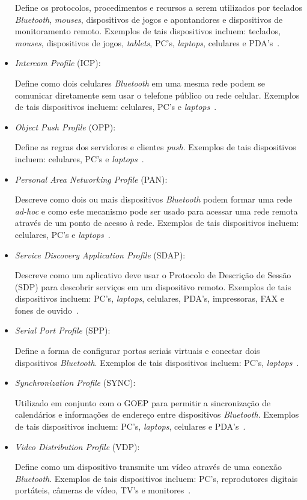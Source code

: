 \begin{itemize}
	Define os protocolos, procedimentos e recursos a serem utilizados por teclados \emph{Bluetooth}, \emph{mouses}, dispositivos de jogos e apontandores e dispositivos de monitoramento remoto. Exemplos de tais dispositivos incluem: teclados, \emph{mouses}, dispositivos de jogos, \emph{tablets}, PC's, \emph{laptops}, celulares e PDA's~\cite{bluetoothprofilesHID}.
	\item \emph{Intercom Profile} (ICP): 

	Define como dois celulares \emph{Bluetooth} em uma mesma rede podem se comunicar diretamente sem usar o telefone público ou rede celular. Exemplos de tais dispositivos incluem: celulares, PC's e \emph{laptops}~\cite{bluetoothprofilesICP}.
	\item \emph{Object Push Profile} (OPP): 

	Define as regras dos servidores e clientes \emph{push}. Exemplos de tais dispositivos incluem: celulares, PC's e \emph{laptops}~\cite{bluetoothprofilesOPP}.
	\item \emph{Personal Area Networking Profile} (PAN): 

	Descreve como dois ou mais dispositivos \emph{Bluetooth} podem formar uma rede \emph{ad-hoc} e como este mecanismo pode ser usado para acessar uma rede remota através de um ponto de acesso à rede. Exemplos de tais dispositivos incluem: celulares, PC's e \emph{laptops}~\cite{bluetoothprofilesPAN}.
	\item \emph{Service Discovery Application Profile} (SDAP): 

	Descreve como um aplicativo deve usar o Protocolo de Descrição de Sessão (SDP) para descobrir serviços em um dispositivo remoto. Exemplos de tais dispositivos incluem: PC's, \emph{laptops}, celulares, PDA's, impressoras, FAX e fones de ouvido~\cite{bluetoothprofilesSDAP}.
	\item \emph{Serial Port Profile} (SPP): 

	Define a forma de configurar portas seriais virtuais e conectar dois dispositivos \emph{Bluetooth}. Exemplos de tais dispositivos incluem: PC's, \emph{laptops}~\cite{bluetoothprofilesSPP}.
	\item \emph{Synchronization Profile} (SYNC): 

	Utilizado em conjunto com o GOEP para permitir a sincronização de calendários e informações de endereço entre dispositivos \emph{Bluetooth}. Exemplos de tais dispositivos incluem: PC's, \emph{laptops}, celulares e PDA's~\cite{bluetoothprofilesSYNC}.
	\item \emph{Video Distribution Profile} (VDP): 

	Define como um dispositivo transmite um vídeo através de uma conexão \emph{Bluetooth}. Exemplos de tais dispositivos incluem: PC's, reprodutores digitais portáteis, câmeras de vídeo, TV's e monitores~\cite{bluetoothprofilesVDP}.
\end{itemize}